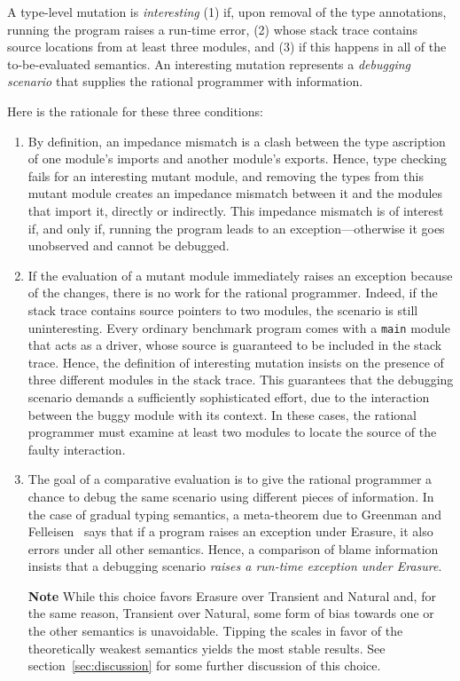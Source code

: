 
A type-level mutation is {\em interesting\/} (1) if, upon removal of the type
annotations, running the program raises a run-time error, (2) whose stack trace
contains source locations from at least three modules, and (3) if this happens
in all of the to-be-evaluated semantics. An interesting mutation represents a
{\em debugging scenario\/} that supplies the rational programmer with
information.

Here is the rationale for these three conditions:
\begin{enumerate}

\item By definition, an impedance mismatch is a clash between the type ascription of
one module's imports and another module's exports. Hence, type checking fails for an
interesting mutant module, and removing the types from this mutant module
creates an impedance mismatch between it and the modules that import it,
directly or indirectly. This impedance mismatch is of interest if, and only if,
running the program leads to an exception---otherwise it goes unobserved and
cannot be debugged.

\item If the evaluation of a mutant module immediately raises an exception because
of the changes, there is no work for the rational programmer. Indeed, if the
stack trace contains source pointers to two modules, the scenario is still
uninteresting. Every ordinary benchmark program comes with a {\tt main} module
that acts as a driver, whose source is guaranteed to be included in the stack
trace.  Hence, the definition of interesting mutation insists on the presence of
three different modules in the stack trace. This guarantees that the debugging
scenario demands a sufficiently sophisticated effort, due to the interaction
between the buggy module with its context.  In these cases, the rational
programmer must examine at least two modules to locate the source of the faulty
interaction.

\item The goal of a comparative evaluation is to give the rational programmer a
chance to debug the same scenario using different pieces of information.  In the
case of gradual typing semantics, a meta-theorem due to Greenman and
Felleisen~\cite{gf-icfp-2018} says that if a program raises an exception under
Erasure, it also errors under all other semantics.  Hence, a comparison of blame
information insists that a debugging scenario {\em raises a run-time exception
under Erasure\/}.

{\bf Note} While this choice favors Erasure over Transient and Natural and, for
the same reason, Transient over Natural, some form of bias towards one or the
other semantics is unavoidable. Tipping the scales in favor of the theoretically
weakest semantics yields the most stable results. See
section~\ref{sec:discussion} for some further discussion of this choice.

\end{enumerate}

